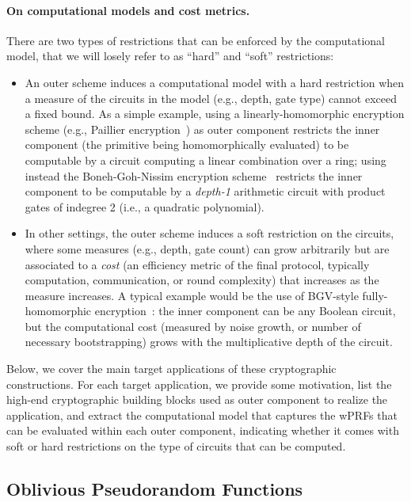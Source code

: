 \documentclass[journal=tosc,submission]{iacrtrans}
\theoremstyle{theorem}
\begin{document}
\paragraph{On computational models and cost metrics.} There are two types of restrictions that can be enforced by the computational model, that we will losely refer to as ``hard'' and ``soft'' restrictions:
\begin{itemize}
	\item An outer scheme induces a computational model with a hard restriction when a measure of the circuits in the model (e.g., depth, gate type) cannot exceed a fixed bound. As a simple example, using a linearly-homomorphic encryption scheme (e.g., Paillier encryption~\cite{EC:Paillier99}) as outer component restricts the inner component (the primitive being homomorphically evaluated) to be computable by a circuit computing a linear combination over a ring; using instead the Boneh-Goh-Nissim encryption scheme~\cite{TCC:BonGohNis05} restricts the inner component to be computable by a \emph{depth-1} arithmetic circuit with product gates of indegree 2 (i.e., a quadratic polynomial).
	\item In other settings, the outer scheme induces a soft restriction on the circuits, where some measures (e.g., depth, gate count) can grow arbitrarily but are associated to a \emph{cost} (an efficiency metric of the final protocol, typically computation, communication, or round complexity) that increases as the measure increases. A typical example would be the use of BGV-style fully-homomorphic encryption~\cite{STOC:Gentry09,ITCS:BraGenVai12}: the inner component can be any Boolean circuit, but the computational cost (measured by noise growth, or number of necessary bootstrapping) grows with the multiplicative depth of the circuit.
\end{itemize}
Below, we cover the main target applications of these cryptographic constructions. For each target application, we provide some motivation, list the high-end cryptographic building blocks used as outer component to realize the application, and extract the computational model that captures the wPRFs that can be evaluated within each outer component, indicating whether it comes with soft or hard restrictions on the type of circuits that can be computed.

\subsection{Oblivious Pseudorandom Functions}
\label{subsec:oprf}
\end{document}
